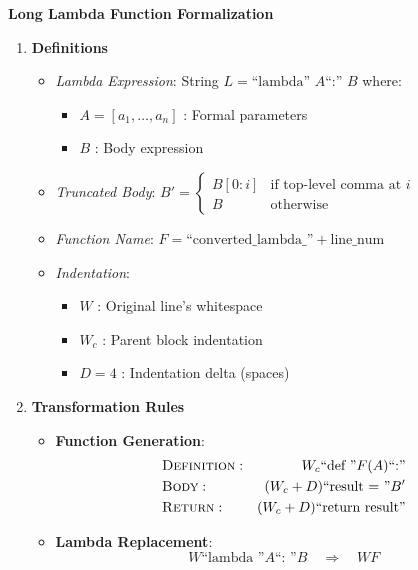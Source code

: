 \documentclass[12pt, titlepage]{article}
\begin{document}
\textbf{Long Lambda Function Formalization}
\begin{enumerate}
  \item \textbf{Definitions}
  \begin{itemize}
      \item \textit{Lambda Expression}: String \( L = \text{``lambda'' }A\text{``:'' }B \) where:
      \begin{itemize}
          \item \( A = [a_1, \dots, a_n] \) : Formal parameters
          \item \( B \) : Body expression
      \end{itemize}
      
      \item \textit{Truncated Body}: \( B' = \begin{cases} 
          B[0:i] & \text{if top-level comma at } i \\
          B & \text{otherwise}
      \end{cases} \)
      
      \item \textit{Function Name}: \( F = \text{``converted\_lambda\_''} + \text{line\_num} \)
      
      \item \textit{Indentation}:
      \begin{itemize}
          \item \( W \) : Original line's whitespace
          \item \( W_c \) : Parent block indentation
          \item \( D = 4 \) : Indentation delta (spaces)
      \end{itemize}
  \end{itemize}

  \item \textbf{Transformation Rules}
  \begin{itemize}
      \item \textbf{Function Generation}:
      \[
      \begin{aligned}
          &\textsc{Definition}: & W_c\text{``def ''}F(A)\text{``:''} \\
          &\textsc{Body}: & (W_c + D)\text{``result = ''}B' \\
          &\textsc{Return}: & (W_c + D)\text{``return result''}
      \end{aligned}
      \]
      
      \item \textbf{Lambda Replacement}:
      \[
      W\text{``lambda ''}A\text{``: ''}B \quad \Rightarrow \quad W F
      \]
  \end{itemize}


\end{enumerate}
\end{document}
